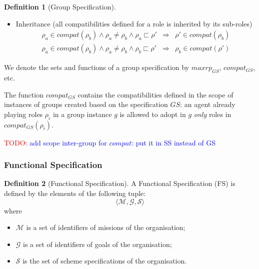 \documentclass{article}
\newcommand{\todo}[1]{\textcolor{red}{TODO: }\textcolor{blue}{#1}}
\newcommand{\set}[1]{\mathcal{#1}}
\newcommand{\subrole}{\sqsubset}
\theoremstyle{definition} \newtheorem{definition}{Definition}
\begin{document}
\begin{definition}[Group Specification]
\begin{itemize}
\item Inheritance (all compatibilities defined for a role is inherited
  by its sub-roles) %
  \begin{eqnarray}
    \rho_a \in compat(\rho_b) \land \rho_a \neq \rho_b \land \rho_a \subrole \rho' &\Rightarrow&  \rho' \in compat(\rho_b)\\
    \rho_a \in compat(\rho_b) \land \rho_a \neq \rho_b \land \rho_b \subrole \rho' &\Rightarrow&  \rho_b \in compat(\rho')
  \end{eqnarray}

\end{itemize}
\end{definition}
We denote the sets and functions of a group specification by
$maxrp_{GS}$, $compat_{GS}$, etc.

The function $compat_{GS}$ contains the compatibilities defined in the
scope of instances of groups created based on the specification $GS$:
an agent already playing roles $\rho_i$ in a group instance $g$ is
allowed to adopt in $g$ \emph{only} roles in $compat_{GS}(\rho_i)$.

\todo{add scope inter-group for $compat$: put it in SS instead of GS}


\subsubsection{Functional Specification}

\begin{definition}[Functional Specification]
  A Functional Specification (FS) is defined by the
  elements of the following tuple:
  \begin{displaymath}
    \langle \set{M}, \set{G}, \set{S} \rangle    
  \end{displaymath}
  where 
  \begin{itemize}
 \item $\set{M}$ is a set of identifiers of missions of the organisation;
 \item $\set{G}$ is a set of identifiers of goals of the organisation;
 \item $\set{S}$ is the set of scheme specifications of the organisation.
  \end{itemize}
\end{definition}
\end{document}
